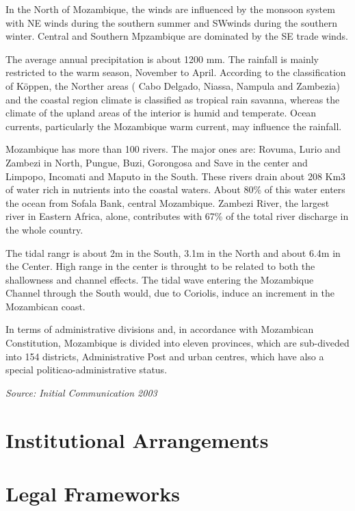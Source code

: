 \documentclass[
]{book}
\begin{document}
In the North of Mozambique, the winds are influenced by the monsoon system with NE winds during the southern summer and SWwinds during the southern winter. Central and Southern Mpzambique are dominated by the SE trade winds.

The average annual precipitation is about 1200 mm. The rainfall is mainly restricted to the warm season, November to April. According to the classification of Köppen, the Norther areas ( Cabo Delgado, Niassa, Nampula and Zambezia) and the coastal region climate is classified as tropical rain savanna, whereas the climate of the upland areas of the interior is humid and temperate. Ocean currents, particularly the Mozambique warm current, may influence the rainfall.

Mozambique has more than 100 rivers. The major ones are: Rovuma, Lurio and Zambezi in North, Pungue, Buzi, Gorongosa and Save in the center and Limpopo, Incomati and Maputo in the South. These rivers drain about 208 Km3 of water rich in nutrients into the coastal waters. About 80\% of this water enters the ocean from Sofala Bank, central Mozambique. Zambezi River, the largest river in Eastern Africa, alone, contributes with 67\% of the total river discharge in the whole country.

The tidal rangr is about 2m in the South, 3.1m in the North and about 6.4m in the Center. High range in the center is throught to be related to both the shallowness and channel effects. The tidal wave entering the Mozambique Channel through the South would, due to Coriolis, induce an increment in the Mozambican coast.

In terms of administrative divisions and, in accordance with Mozambican Constitution, Mozambique is divided into eleven provinces, which are sub-diveded into 154 districts, Administrative Post and urban centres, which have also a special politicao-administrative status.

\emph{Source: Initial Communication 2003}

\hypertarget{institutional-arrangements}{%
\section{Institutional Arrangements}\label{institutional-arrangements}}

\hypertarget{legal-frameworks}{%
\section{Legal Frameworks}\label{legal-frameworks}}
\end{document}
